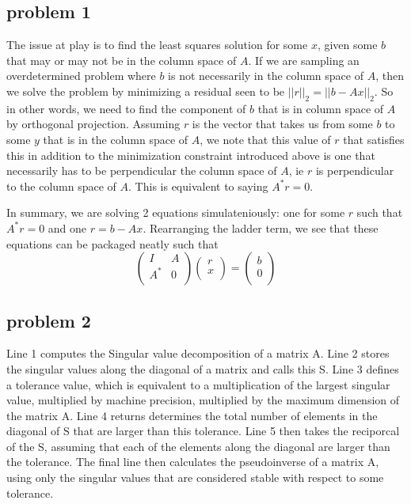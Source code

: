 \documentclass[12pt,a4paper,twoside]{article}
\begin{document}
\subsection{problem 1}
The issue at play is to find the least squares solution for some $x$, given some $b$ that may or may not be in the column space of $A$. If we are sampling an overdetermined problem where $b$ is not necessarily in the column space of $A$, then we solve the problem by minimizing a residual seen to be $||r||_2=|| b - Ax ||_2$. So in other words, we need to find the component of $b$ that is in column space of $A$ by orthogonal projection. Assuming $r$ is the vector that takes us from some $b$ to some $y$ that is in the column space of $A$, we note that this value of $r$ that satisfies this in addition to the minimization constraint introduced above is one that necessarily has to be perpendicular the column space of $A$, ie $r$ is perpendicular to the column space of $A$. This is equivalent to saying $A^* r =0$.

In summary, we are solving 2 equations simulateniously: one for some $r$ such that $A^* r =0$ and one $r=b-Ax$. Rearranging the ladder term, we see that these equations can be packaged neatly such that
\begin{equation}
\begin{pmatrix}
I & A \\
A^* & 0 \\
\end{pmatrix}\begin{pmatrix}
r \\
x \\
\end{pmatrix}
= \begin{pmatrix}
b \\
0\\
\end{pmatrix}
\end{equation}

\subsection{problem 2}
Line 1 computes the Singular value decomposition of a matrix A. Line 2 stores the singular values along the diagonal of a matrix and calls this S. Line 3 defines a tolerance value, which is equivalent to a multiplication of the largest singular value, multiplied by machine precision, multiplied by the maximum dimension of the matrix A. Line 4 returns determines the total number of elements in the diagonal of S that are larger than this tolerance. Line 5 then takes the reciporcal of the S, assuming that each of the elements along the diagonal are larger than the tolerance. The final line then calculates the pseudoinverse of a matrix A, using only the singular values that are considered stable with respect to some tolerance. 
\end{document}
